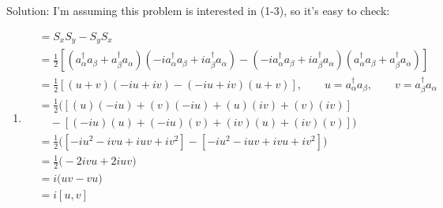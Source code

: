 \begin{homeworkProblem}
\begin{itemize}
\begin{callout}{Solution:}
                I'm assuming this problem is interested in (1-3), so it's easy to check:
                \begin{enumerate}[(1)]
                    \item 
                        \begin{align*}
                            [S_x,S_y] &= S_xS_y - S_yS_x \\ 
                                      &= \frac{1}{2} \left[ \left( a_{\alpha}^{\dagger}a_{\beta} + a_{\beta}^{\dagger} a_{\alpha} \right)\left( -i a_{\alpha}^{\dagger}a_{\beta} + ia_{\beta}^{\dagger} a_{\alpha} \right) - \left( -i a_{\alpha}^{\dagger}a_{\beta} + ia_{\beta}^{\dagger} a_{\alpha} \right)\left( a_{\alpha}^{\dagger}a_{\beta} + a_{\beta}^{\dagger} a_{\alpha} \right) \right] \\
                               &= \frac{1}{2} \left[ \left( u + v \right)\left( -i u + iv \right) - \left( -i u + iv \right)\left( u + v \right) \right], \qquad u = a_{\alpha}^{\dagger}a_{\beta}, \qquad v = a_{\beta}^{\dagger} a_{\alpha}\\
                               &= \frac{1}{2} \Big( \left[ (u)(-iu) + (v)(-iu) + (u)(iv) + (v)(iv) \right]\\ &\quad- [(-iu)(u) + (-iu)(v) + (iv)(u) + (iv)(v)] \Big) \\
                               &= \frac{1}{2} \Big( \left[ -iu^{2} - ivu + iuv + iv^{2} \right] - [-iu^{2} -iuv + ivu + iv^{2}] \Big) \\
                               &= \frac{1}{2} \Big( - 2ivu + 2iuv \Big) \\
                               &= i\Big( uv - vu \Big) \\
                               &= i[u,v] \\
                        \end{align*}


\end{enumerate}
\end{callout}
\end{itemize}
\end{homeworkProblem}
